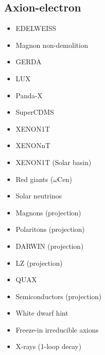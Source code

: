 \documentclass[9pt,twocolumn]{extarticle}
\begin{document}
\begin{mdframed}
\vspace{-1em}
\section{Axion-electron}\vspace{-0.5em}
\begin{itemize}\setlength\itemsep{-0.5em}
    \item EDELWEISS~\cite{EDELWEISS:2018tde}
    \item Magnon non-demolition~\cite{Ikeda:2021mlv}
    \item GERDA~\cite{GERDA:2020emj}
    \item LUX~\cite{LUX:2017glr}
    \item Panda-X~\cite{PandaX:2017ock}
    \item SuperCDMS~\cite{SuperCDMS:2019jxx}
    \item XENON1T~\cite{XENON:2019gfn,XENON:2020rca}
    \item XENONnT~\cite{XENONCollaboration:2022kmb}
    \item XENON1T (Solar basin)~\cite{VanTilburg:2020jvl}
    \item Red giants ($\omega$Cen)~\cite{Capozzi:2020cbu}
    \item Solar neutrinos~\cite{Gondolo:2008dd}
    \item Magnons (projection)~\cite{Chigusa:2020gfs}
        \item Polaritons (projection)~\cite{Mitridate:2020kly}
    \item DARWIN (projection)~\cite{DARWIN:2016hyl}
    \item LZ (projection)~\cite{LZ:2021xov}
    \item QUAX~\cite{Crescini:2018qrz,QUAX:2020adt}
  	\item Semiconductors (projection)~\cite{Bloch:2016sjj}
  	\item White dwarf hint~\cite{Giannotti:2017hny}
  	\item Freeze-in irreducible axions~\cite{Langhoff:2022bij}
  	\item X-rays (1-loop decay)~\cite{Ferreira:2022egk}
\end{itemize}
\end{mdframed}
\end{document}

